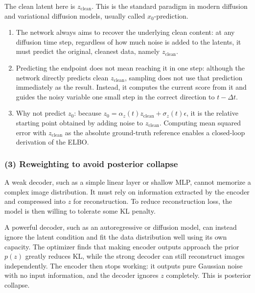The clean latent here is \(z_{\mathrm{clean}}\). This is the standard paradigm in modern diffusion and variational diffusion models, usually called \(x_0\)-prediction.

\begin{enumerate}
\def\labelenumi{\arabic{enumi}.}
\tightlist
\item
  The network always aims to recover the underlying clean content: at any diffusion time step, regardless of how much noise is added to the latents, it must predict the original, cleanest data, namely \(z_{\mathrm{clean}}\).
\item
  Predicting the endpoint does not mean reaching it in one step: although the network directly predicts clean \(z_{\mathrm{clean}}\), sampling does not use that prediction immediately as the result. Instead, it computes the current score from it and guides the noisy variable one small step in the correct direction to \(t-\Delta t\).
\item
  Why not predict \(z_0\): because \(z_0=\alpha_z(t)z_{\mathrm{clean}}+\sigma_z(t)\epsilon\), it is the relative starting point obtained by adding noise to \(z_{\mathrm{clean}}\). Computing mean squared error with \(z_{\mathrm{clean}}\) as the absolute ground-truth reference enables a closed-loop derivation of the ELBO.
\end{enumerate}

\hypertarget{reweighting-to-avoid-posterior-collapse}{%
\subsubsection{(3) Reweighting to avoid posterior collapse}\label{reweighting-to-avoid-posterior-collapse}}

A weak decoder, such as a simple linear layer or shallow MLP, cannot memorize a complex image distribution. It must rely on information extracted by the encoder and compressed into \(z\) for reconstruction. To reduce reconstruction loss, the model is then willing to tolerate some KL penalty.

A powerful decoder, such as an autoregressive or diffusion model, can instead ignore the latent condition and fit the data distribution well using its own capacity. The optimizer finds that making encoder outputs approach the prior \(p(z)\) greatly reduces KL, while the strong decoder can still reconstruct images independently. The encoder then stops working: it outputs pure Gaussian noise with no input information, and the decoder ignores \(z\) completely. This is posterior collapse.


